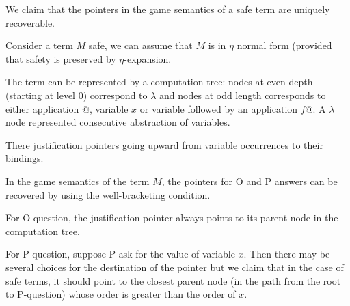 We claim that the pointers in the game semantics of a safe term are
uniquely recoverable.

Consider a term $M$ safe, we can assume that $M$ is in $\eta$ normal
form (provided that safety is preserved by $\eta$-expansion.

The term can be represented by a computation tree: nodes at even
depth (starting at level 0) correspond to $\lambda$ and nodes at odd
length corresponds to either application $@$, variable $x$ or
variable followed by an application $f@$. A $\lambda$ node
represented consecutive abstraction of variables.

There justification pointers going upward from variable occurrences
to their bindings.

In the game semantics of the term $M$, the pointers for O and P
answers can be recovered by using the well-bracketing condition.

For O-question, the justification pointer always points to its
parent node in the computation tree.

For P-question, suppose P ask for the value of variable $x$. Then
there may be several choices for the destination of the pointer but
we claim that in the case of safe terms, it should point to the
closest parent node (in the path from the root to P-question) whose
order is greater than the order of $x$.
